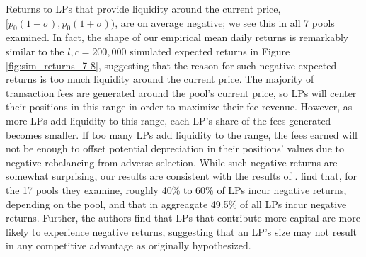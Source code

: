 \documentclass[11pt]{article}
\begin{document}
Returns to LPs that provide liquidity around the current price, $[p_0(1 - \sigma), p_0(1 + \sigma))$, are on average negative; we see this in all 7 pools examined. In fact, the shape of our empirical mean daily returns is remarkably similar to the $l, c = 200,000$ simulated expected returns in Figure \ref{fig:sim_returns_7-8}, suggesting that the reason for such negative expected returns is too much liquidity around the current price. The majority of transaction fees are generated around the pool's current price, so LPs will center their positions in this range in order to maximize their fee revenue. However, as more LPs add liquidity to this range, each LP's share of the fees generated becomes smaller. If too many LPs add liquidity to the range, the fees earned will not be enough to offset potential depreciation in their positions' values due to negative rebalancing from adverse selection. While such negative returns are somewhat surprising, our results are consistent with the results of \citet{loesch2021impermanent}. \citet{loesch2021impermanent} find that, for the 17 pools they examine, roughly 40\% to 60\% of LPs incur negative returns, depending on the pool, and that in aggreagate 49.5\% of all LPs incur negative returns. Further, the authors find that LPs that contribute more capital are more likely to experience negative returns, suggesting that an LP's size may not result in any competitive advantage as originally hypothesized.
\end{document}
